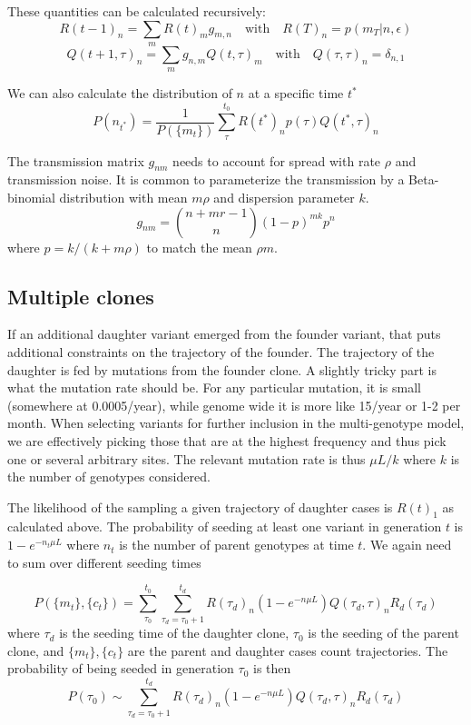 \documentclass[aps,rmp, onecolumn]{revtex4}
\begin{document}
These quantities can be calculated recursively:
\begin{equation}
    R(t-1)_n = \sum_m R(t)_m g_{m,n} \quad \mathrm{with} \quad R(T)_n = p(m_{T}|n,\epsilon)
\end{equation}
\begin{equation}
    Q(t+1,\tau)_n = \sum_m g_{n,m}Q(t,\tau)_m  \quad \mathrm{with} \quad Q(\tau,\tau)_n = \delta_{n,1}
\end{equation}


We can also calculate the distribution of $n$ at a specific time $t^*$
\begin{equation}
    P(n_{t^*}) = \frac{1}{P(\{m_t\})}\sum_{\tau}^{t_0} R(t^*)_n p(\tau) Q(t^*,\tau)_n
\end{equation}


The transmission matrix $g_{nm}$ needs to account for spread with rate $\rho$ and transmission noise.
It is common to parameterize the transmission by a Beta-binomial distribution with mean $m\rho$ and dispersion parameter $k$.
\begin{equation}
    g_{nm} = {n + mr - 1 \choose n} (1-p)^{m k} p^n
\end{equation}
where $p=k/(k+m\rho)$ to match the mean $\rho m$.


\subsection*{Multiple clones}
If an additional daughter variant emerged from the founder variant, that puts additional constraints on the trajectory of the founder.
The trajectory of the daughter is fed by mutations from the founder clone.
A slightly tricky part is what the mutation rate should be.
For any particular mutation, it is small (somewhere at 0.0005/year), while genome wide it is more like 15/year or 1-2 per month.
When selecting variants for further inclusion in the multi-genotype model, we are effectively picking those that are at the highest frequency and thus pick one or several arbitrary sites.
The relevant mutation rate is thus $\mu L/k$ where $k$ is the number of genotypes considered.

The likelihood of the sampling a given trajectory of daughter cases is $R(t)_1$ as calculated above.
The probability of seeding at least one variant in generation $t$ is $1-e^{-n_t\mu L}$ where $n_t$ is the number of parent genotypes at time $t$.
We again need to sum over different seeding times

\begin{equation}
    P(\{m_t\}, \{c_t\}) = \sum_{\tau_0}^{t_0}\sum_{\tau_d=\tau_0+1}^{t_d} R(\tau_d)_n (1-e^{-n\mu L}) Q(\tau_d,\tau)_n R_d(\tau_d)
\end{equation}
where $\tau_d$ is the seeding time of the daughter clone, $\tau_0$ is the seeding of the parent clone, and $\{m_t\}, \{c_t\}$ are the parent and daughter cases count trajectories.
The probability of being seeded in generation $\tau_0$ is then
\begin{equation}
    P(\tau_0) \sim \sum_{\tau_d=\tau_0+1}^{t_d} R(\tau_d)_n (1-e^{-n\mu L}) Q(\tau_d,\tau)_n R_d(\tau_d)
\end{equation}
\end{document}
